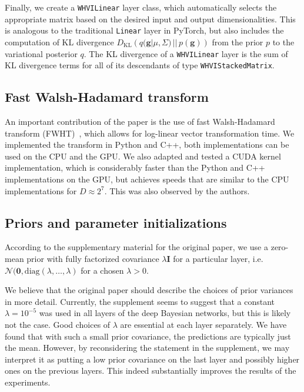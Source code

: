 \documentclass[11pt, twocolumn]{article}
\begin{document}
    Finally, we create a \texttt{WHVILinear} layer class, which automatically selects the appropriate matrix based on the desired input and output dimensionalities.
    This is analogous to the traditional \texttt{Linear} layer in PyTorch, but also includes the computation of KL divergence $D_\mathrm{KL}\left(q(\mathbf{g}|\mu, \Sigma)\, ||\, p(\mathbf{g})\right)$ from the prior $p$ to the variational posterior $q$.
    The KL divergence of a \texttt{WHVILinear} layer is the sum of KL divergence terms for all of its descendants of type \texttt{WHVIStackedMatrix}.

    \subsection{Fast Walsh-Hadamard transform}
    An important contribution of the paper is the use of fast Walsh-Hadamard transform (FWHT)~\cite{fino1976unified}, which allows for log-linear vector transformation time.
    We implemented the transform in Python and C++, both implementations can be used on the CPU and the GPU.
    We also adapted and tested a CUDA kernel implementation, which is considerably faster than the Python and C++ implementations on the GPU, but achieves speeds that are similar to the CPU implementations for $D \approx 2^7$.
    This was also observed by the authors.


    \subsection{Priors and parameter initializations}
    According to the supplementary material for the original paper, we use a zero-mean prior with fully factorized covariance $\lambda \mathbf{I}$ for a particular layer, i.e. $\mathcal{N}(\mathbf{0}, \mathrm{diag}(\lambda, \dots, \lambda)$ for a chosen $\lambda > 0$.

    We believe that the original paper should describe the choices of prior variances in more detail.
    Currently, the supplement seems to suggest that a constant $\lambda = 10^{-5}$ was used in all layers of the deep Bayesian networks, but this is likely not the case.
    Good choices of $\lambda$ are essential at each layer separately.
    We have found that with such a small prior covariance, the predictions are typically just the mean.
    However, by reconsidering the statement in the supplement, we may interpret it as putting a low prior covariance on the last layer and possibly higher ones on the previous layers.
    This indeed substantially improves the results of the experiments.
\end{document}
